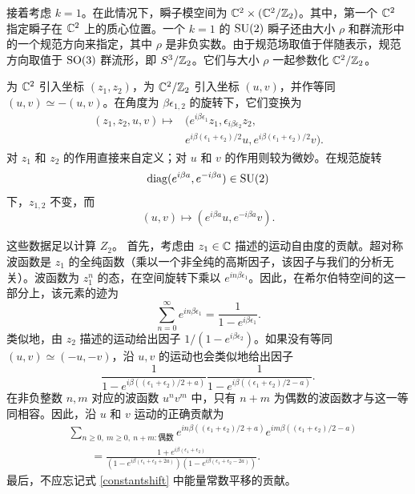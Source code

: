 接着考虑 $k=1$。在此情况下，瞬子模空间为 $\mathbb{C}^2\times(\mathbb{C}^2/\mathbb{Z}_2)$。其中，第一个 $\mathbb{C}^2$ 指定瞬子在 $\mathbb{C}^2$ 上的质心位置。一个 $k=1$ 的 $\mathop{\mathrm{SU}}(2)$ 瞬子还由大小 $\rho$ 和群流形中的一个规范方向来指定，其中 $\rho$ 是非负实数。由于规范场取值于伴随表示，规范方向取值于 $\mathop{\mathrm{SO}}(3)$ 群流形，即 $S^3/\mathbb{Z}_2$。它们与大小 $\rho$ 一起参数化 $\mathbb{C}^2/\mathbb{Z}_2$。

为 $\mathbb{C}^2$ 引入坐标 $(z_1,z_2)$，为 $\mathbb{C}^2/\mathbb{Z}_2$ 引入坐标 $(u,v)$，并作等同 $(u,v)\simeq-(u,v)$。在角度为 $\beta\epsilon_{1,2}$ 的旋转下，它们变换为
\begin{equation}
\begin{aligned}
(z_1,z_2,u,v)\mapsto{}&(e^{i\beta\epsilon_1}z_1,\epsilon_{i\beta\epsilon_2}z_2,\\
&e^{i\beta(\epsilon_1+\epsilon_2)/2}u,e^{i\beta(\epsilon_1+\epsilon_2)/2}v).
\end{aligned}
\end{equation}
对 $z_1$ 和 $z_2$ 的作用直接来自定义；对 $u$ 和 $v$ 的作用则较为微妙。在规范旋转
\begin{equation}
\mathop{\mathrm{diag}}(e^{i\beta a},e^{-i\beta a})\in\mathop{\mathrm{SU}}(2)
\end{equation}
下，$z_{1,2}$ 不变，而
\begin{equation}
(u,v)\mapsto(e^{i\beta a}u,e^{-i\beta a}v).
\end{equation}

这些数据足以计算 $Z_2$。
首先，考虑由 $z_1\in\mathbb{C}$ 描述的运动自由度的贡献。超对称波函数是 $z_1$ 的全纯函数（乘以一个非全纯的高斯因子，该因子与我们的分析无关）。波函数为 $z_1^n$ 的态，在空间旋转下乘以 $e^{in\beta\epsilon_1}$。因此，在希尔伯特空间的这一部分上，该元素的迹为
\begin{equation}
\sum_{n=0}^\infty e^{in\beta\epsilon_1}=\frac1{1-e^{i\beta\epsilon_1}}.
\end{equation}
类似地，由 $z_2$ 描述的运动给出因子 $1/(1-e^{i\beta\epsilon_2})$。如果没有等同 $(u,v)\simeq(-u,-v)$，沿 $u,v$ 的运动也会类似地给出因子
\begin{equation}
\frac1{1-e^{i\beta((\epsilon_1+\epsilon_2)/2+a)}}\frac1{1-e^{i\beta((\epsilon_1+\epsilon_2)/2-a)}}.
\end{equation}
在非负整数 $n,m$ 对应的波函数 $u^n v^m$ 中，只有 $n+m$ 为偶数的波函数才与这一等同相容。因此，沿 $u$ 和 $v$ 运动的正确贡献为
\begin{equation}
\begin{aligned}
&\sum_{n\ge0,\ m\ge0,\ n+m:\text{偶数}}e^{in\beta((\epsilon_1+\epsilon_2)/2+a)}e^{im\beta((\epsilon_1+\epsilon_2)/2-a)}\\
&\qquad=\frac{1+e^{i\beta(\epsilon_1+\epsilon_2)}}{(1-e^{i\beta(\epsilon_1+\epsilon_2+2a)})(1-e^{i\beta(\epsilon_1+\epsilon_2-2a)})}.
\end{aligned}
\end{equation}
最后，不应忘记式 \eqref{constantshift} 中能量常数平移的贡献。

